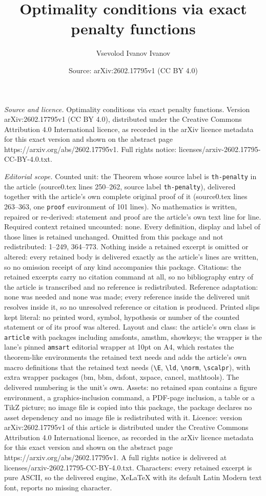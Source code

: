 \documentclass[10pt,a4paper]{amsart}
\title[Optimality conditions via exact penalty functions]{Optimality conditions via exact penalty functions}
\author{Vsevolod Ivanov Ivanov}
\date{Source: arXiv:2602.17795v1 (CC BY 4.0)}
\begin{document}
\maketitle

\noindent\emph{Source and licence.} Optimality conditions via exact penalty functions. Version arXiv:2602.17795v1 (CC BY 4.0), distributed under the Creative Commons Attribution 4.0 International licence, as recorded in the arXiv licence metadata for this exact version and shown on the abstract page https://arxiv.org/abs/2602.17795v1. Full rights notice: licenses/arxiv-2602.17795-CC-BY-4.0.txt.\par\smallskip

\noindent\textit{Editorial scope.} Counted unit: the Theorem whose source label is \texttt{th-penalty} in the article (source0.tex lines 250--262, source label \texttt{th-penalty}), delivered together with the article's own complete original proof of it (source0.tex lines 263--363, one \texttt{proof} environment of 101 lines). No mathematics is written, repaired or re-derived: statement and proof are the article's own text line for line. Required context retained uncounted: none. Every definition, display and label of those lines is retained unchanged. Omitted from this package and not redistributed: 1--249, 364--773. Nothing inside a retained excerpt is omitted or altered: every retained body is delivered exactly as the article's lines are written, so no omission receipt of any kind accompanies this package. Citations: the retained excerpts carry no citation command at all, so no bibliography entry of the article is transcribed and no reference is redistributed. Reference adaptation: none was needed and none was made; every reference inside the delivered unit resolves inside it, so no unresolved reference or citation is produced. Printed slips kept literal: no printed word, symbol, hypothesis or number of the counted statement or of its proof was altered. Layout and class: the article's own class is \texttt{article} with packages including amsfonts, amsthm, showkeys; the wrapper is the lane's pinned \texttt{amsart} editorial wrapper at 10pt on A4, which restates the theorem-like environments the retained text needs and adds the article's own macro definitions that the retained text needs (\texttt{\textbackslash E}, \texttt{\textbackslash ld}, \texttt{\textbackslash norm}, \texttt{\textbackslash scalpr}), with extra wrapper packages (bm, bbm, dsfont, xspace, cancel, mathtools). The delivered numbering is the unit's own. Assets: no retained span contains a figure environment, a graphics-inclusion command, a PDF-page inclusion, a table or a TikZ picture; no image file is copied into this package, the package declares no asset dependency and no image file is redistributed with it. Licence: version arXiv:2602.17795v1 of this article is distributed under the Creative Commons Attribution 4.0 International licence, as recorded in the arXiv licence metadata for this exact version and shown on the abstract page https://arxiv.org/abs/2602.17795v1. A full rights notice is delivered at licenses/arxiv-2602.17795-CC-BY-4.0.txt. Characters: every retained excerpt is pure ASCII, so the delivered engine, XeLaTeX with its default Latin Modern text font, reports no missing character.
\end{document}
